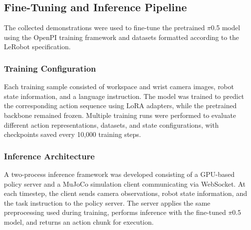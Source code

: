 \documentclass[conference, 12pt]{IEEEtran}
\begin{document}





\subsection{Fine-Tuning and Inference Pipeline}

The collected demonstrations were used to fine-tune the pretrained $\pi$0.5 model using the OpenPI training framework and datasets formatted according to the LeRobot specification.

\subsubsection{Training Configuration}

Each training sample consisted of workspace and wrist camera images, robot state information, and a language instruction. The model was trained to predict the corresponding action sequence using LoRA adapters, while the pretrained backbone remained frozen. Multiple training runs were performed to evaluate different action representations, datasets, and state configurations, with checkpoints saved every 10,000 training steps.

\subsubsection{Inference Architecture}

A two-process inference framework was developed consisting of a GPU-based policy server and a MuJoCo simulation client communicating via WebSocket. At each timestep, the client sends camera observations, robot state information, and the task instruction to the policy server. The server applies the same preprocessing used during training, performs inference with the fine-tuned $\pi$0.5 model, and returns an action chunk for execution.
\end{document}

